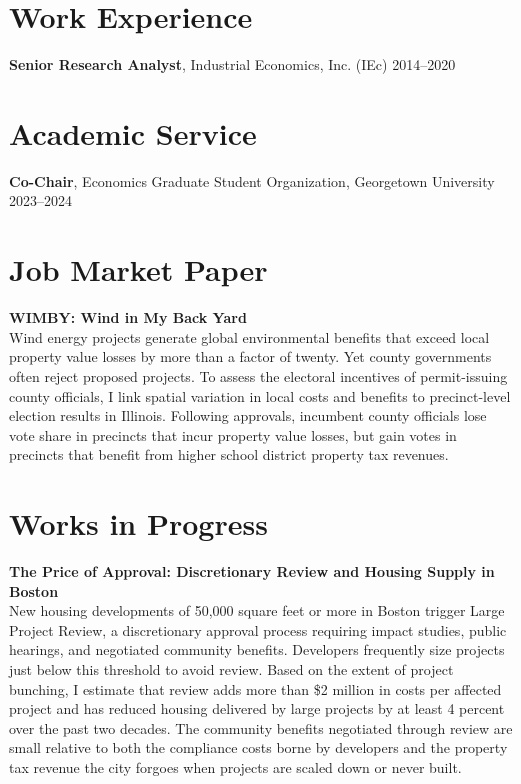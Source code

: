\documentclass[11pt]{article}
\begin{document}
\section*{Work Experience}

\textbf{Senior Research Analyst}, Industrial Economics, Inc. (IEc) \hfill 2014–2020

\section*{Academic Service}

\textbf{Co-Chair}, Economics Graduate Student Organization, Georgetown University \hfill 2023–2024

\section*{Job Market Paper}

\textbf{WIMBY: Wind in My Back Yard} \\
Wind energy projects generate global environmental benefits that exceed local property value losses by more than a factor of twenty. Yet county governments often reject proposed projects. To assess the electoral incentives of permit-issuing county officials, I link spatial variation in local costs and benefits to precinct-level election results in Illinois. Following approvals, incumbent county officials lose vote share in precincts that incur property value losses, but gain votes in precincts that benefit from higher school district property tax revenues.
\section*{Works in Progress}
\textbf{The Price of Approval: Discretionary Review and Housing Supply in Boston} \\
New housing developments of 50,000 square feet or more in Boston trigger Large Project Review, a discretionary approval process requiring impact studies, public hearings, and negotiated community benefits. Developers frequently size projects just below this threshold to avoid review. Based on the extent of project bunching, I estimate that review adds more than \$2 million in costs per affected project and has reduced housing delivered by large projects by at least 4 percent over the past two decades. The community benefits negotiated through review are small relative to both the compliance costs borne by developers and the property tax revenue the city forgoes when projects are scaled down or never built. 
\end{document}
